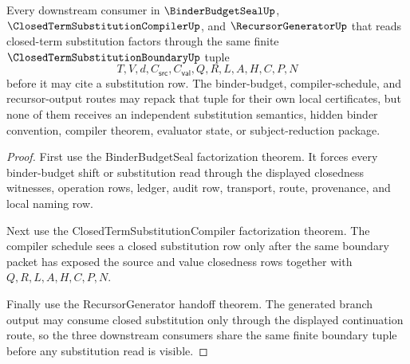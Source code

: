 \begin{theorem}
\label{thm:closed-term-substitution-boundary-downstream-factorization-triad}
Every downstream consumer in $\BinderBudgetSealUp$, $\ClosedTermSubstitutionCompilerUp$, and $\RecursorGeneratorUp$ that reads closed-term substitution factors through the same finite $\ClosedTermSubstitutionBoundaryUp$ tuple
$$
T,V,d,C_{\mathsf{src}},C_{\mathsf{val}},Q,R,L,A,H,C,P,N
$$
before it may cite a substitution row. The binder-budget, compiler-schedule, and recursor-output routes may repack that tuple for their own local certificates, but none of them receives an independent substitution semantics, hidden binder convention, compiler theorem, evaluator state, or subject-reduction package.
\end{theorem}
\begin{proof}
First use the BinderBudgetSeal factorization theorem. It forces every binder-budget shift or substitution read through the displayed closedness witnesses, operation rows, ledger, audit row, transport, route, provenance, and local naming row.

Next use the ClosedTermSubstitutionCompiler factorization theorem. The compiler schedule sees a closed substitution row only after the same boundary packet has exposed the source and value closedness rows together with $Q,R,L,A,H,C,P,N$.

Finally use the RecursorGenerator handoff theorem. The generated branch output may consume closed substitution only through the displayed continuation route, so the three downstream consumers share the same finite boundary tuple before any substitution read is visible.
\end{proof}

